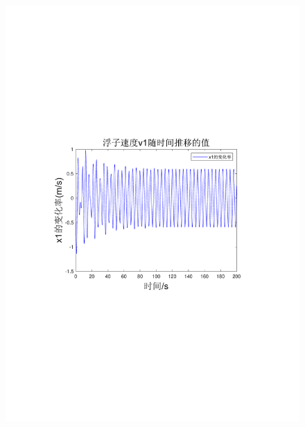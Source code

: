 \documentclass[12pt,utf8]{article}
\begin{document}
\begin{figure}[htbp]
\begin{minipage}{0.45\linewidth}
		\includegraphics[width=0.9\linewidth]{figures/T1-1浮子速度v1.pdf}
		\label{chutian2}%
	\end{minipage}
	\begin{minipage}{0.45\linewidth}

\end{minipage}
\end{figure}
\end{document}
